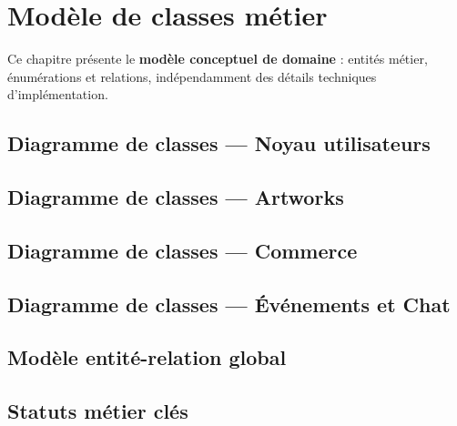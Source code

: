 \chapter{Modèle de classes métier}

Ce chapitre présente le \textbf{modèle conceptuel de domaine} : entités métier,
énumérations et relations, indépendamment des détails techniques d'implémentation.

\section{Diagramme de classes — Noyau utilisateurs}


\section{Diagramme de classes — Artworks}


\section{Diagramme de classes — Commerce}


\section{Diagramme de classes — Événements et Chat}


\section{Modèle entité-relation global}


\section{Statuts métier clés}

